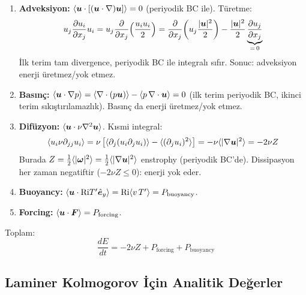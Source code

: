 \begin{enumerate}
    \item \textbf{Adveksiyon:} $\langle \bm{u} \cdot [(\bm{u} \cdot \nabla)\bm{u}] \rangle = 0$ (periyodik BC ile). Türetme:
    \begin{equation}
        u_j \frac{\partial u_i}{\partial x_j} u_i = u_j \frac{\partial }{\partial x_j}\!\left(\frac{u_i u_i}{2}\right)  = \frac{\partial }{\partial x_j}\!\left(u_j \frac{|\bm{u}|^2}{2}\right) - \frac{|\bm{u}|^2}{2} \underbrace{\frac{\partial u_j}{\partial x_j}}_{=\,0}
    \end{equation}
    İlk terim tam divergence, periyodik BC ile integralı sıfır. Sonuc: adveksiyon enerji üretmez/yok etmez.

    \item \textbf{Basınç:} $\langle \bm{u} \cdot \nabla p \rangle = \langle \nabla \cdot(p\bm{u}) \rangle - \langle p \, \nabla \cdot\bm{u} \rangle = 0$ (ilk terim periyodik BC, ikinci terim sıkıştırılamazlık). Basınç da enerji üretmez/yok etmez.

    \item \textbf{Difüzyon:} $\langle \bm{u} \cdot \nu \nabla^2 \bm{u} \rangle$. Kısmi integral:
    \begin{equation}
        \langle u_i \nu \partial_{jj} u_i \rangle = \nu \left[ \langle \partial_j(u_i \partial_j u_i) \rangle - \langle (\partial_j u_i)^2 \rangle \right] = -\nu \langle |\nabla \bm{u}|^2 \rangle = -2\nu Z
    \end{equation}
    Burada $Z = \frac{1}{2} \langle |\bm{\omega}|^2 \rangle = \frac{1}{2} \langle |\nabla \bm{u}|^2 \rangle$ enstrophy (periyodik BC'de). Dissipasyon her zaman negatiftir ($-2\nu Z \leq 0$): enerji yok eder.

    \item \textbf{Buoyancy:} $\langle \bm{u} \cdot \mathrm{Ri} T' \hat{\bm{e}}_y \rangle = \mathrm{Ri} \langle v \, T' \rangle = P_{\text{buoyancy}}$.

    \item \textbf{Forcing:} $\langle \bm{u} \cdot \bm{F} \rangle = P_{\text{forcing}}$.
\end{enumerate}

Toplam:
\begin{equation}
    \boxed{\frac{dE}{dt} = -2\nu Z + P_{\text{forcing}} + P_{\text{buoyancy}}}
    \label{eq:energy_balance_full}
\end{equation}

\subsection{Laminer Kolmogorov İçin Analitik Değerler}


